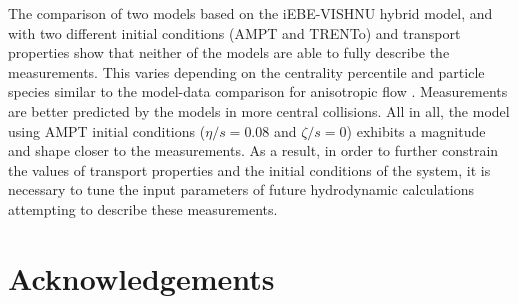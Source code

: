 \documentclass[ALICE,manyauthors]{cernphprep}
\providecommand{\DIFaddtex}[1]{{\protect\color{blue}\uwave{#1}}} %
\providecommand{\DIFaddbegin}{} %
\providecommand{\DIFaddend}{} %
\providecommand{\DIFadd}[1]{\texorpdfstring{\DIFaddtex{#1}}{#1}} %
\newcommand{\DIFaddincludegraphics}[2][]{{\color{blue}\fbox{\DIFOincludegraphics[#1]{#2}}}} %
\DeclareRobustCommand{\DIFaddbegin}{\DIFOaddbegin \let\includegraphics\DIFaddincludegraphics} %
\DeclareRobustCommand{\DIFaddend}{\DIFOaddend \let\includegraphics\DIFOincludegraphics} %
\begin{document}
The comparison of two models based on the iEBE-VISHNU hybrid model, and with two different initial conditions (AMPT and TRENTo) and transport properties show that neither of the models are able to fully describe the measurements. This varies depending on the centrality percentile and particle species similar to the model-data comparison for anisotropic flow \DIFaddbegin \DIFadd{coefficients }\DIFaddend \cite{Acharya:2018zuq}. Measurements are better predicted by the models in more central collisions. All in all, the model using AMPT initial conditions ($\eta/s = 0.08$ and $\zeta/s =0$) exhibits a magnitude and shape closer to the measurements. As a result, in order to further constrain the values of transport properties and the initial conditions of the system, it is necessary to tune the input parameters of future hydrodynamic calculations attempting to describe these measurements.
%


\newenvironment{acknowledgement}{\relax}{\relax}
\begin{acknowledgement}
\section*{Acknowledgements}
%
\end{acknowledgement}

\newpage
\end{document}
